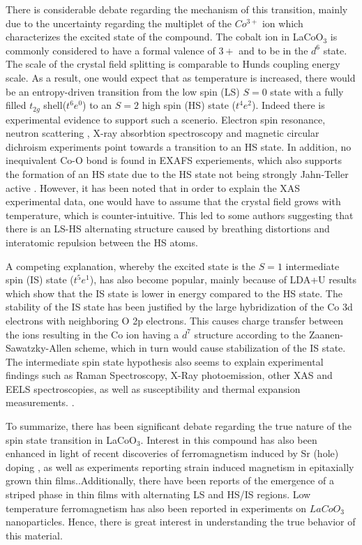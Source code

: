 \documentclass[10pt]{ruthesis}
\begin{document}
{There is considerable debate regarding the mechanism of this transition, mainly due to the uncertainty regarding the multiplet of the $Co^{3+}$ ion which  characterizes the excited state of the compound.  The cobalt ion in LaCoO$_3$ is commonly considered to have a formal valence of $3+$ and to be in the $d^6$ state. The scale of the crystal field splitting is comparable to Hunds coupling energy scale. As a result, one would expect that as temperature is increased, there would be an entropy-driven transition from the low spin (LS) $S=0$ state with a fully filled $t_{2g}$ shell($t^6e^0$) to an $S=2$ high spin (HS) state ($t^4e^2$)\cite{Goodenough}. Indeed there is experimental evidence to support such a scenerio. Electron spin resonance\cite{Zopka}, neutron scattering \cite{Podlesnyak}, X-ray absorbtion spectroscopy and magnetic circular dichroism experiments\cite{Haverfort} point towards a transition to an HS state. In addition, no inequivalent Co-O bond is found in EXAFS experiements, which also supports the formation of an HS state due to the HS state not being strongly Jahn-Teller active \cite{Sundaram}. However, it has been noted that in order to explain the  XAS experimental data, one would have to assume that the crystal field grows with temperature, which is counter-intuitive.\cite{Eder, Haverfort} This led to some authors suggesting that there is an LS-HS alternating structure caused by breathing distortions\cite{Bari} \cite{Goodenough} and interatomic repulsion between the HS atoms.\cite{Asaka, Eder} 
 
A competing explanation, whereby the excited state is the $S=1$ intermediate spin (IS) state ($t^5e^1$), has also become popular\cite{Heikes, Radaelli}, mainly because of LDA+U results which show that the    
IS state is lower in energy compared to the HS state.\cite{Korotin, Pandey, Anisimov} The stability of the IS state has been justified by the large hybridization of the Co 3d electrons with neighboring O 2p electrons. This causes charge transfer between the ions resulting in the Co ion having a $d^7$ structure according to the Zaanen-Sawatzky-Allen scheme,\cite{Zaanen} which in turn would cause stabilization of the IS state. The intermediate spin state hypothesis also seems to explain experimental findings such as Raman Spectroscopy, X-Ray photoemission, other XAS and EELS spectroscopies, as well as susceptibility and thermal expansion measurements. \cite{Saitoh, Abbate, Masuda, Klie, Zobel, Gne, Maris, Vogt}. 

To summarize, there has been significant debate regarding the true nature of the spin state transition in LaCoO$_3$. Interest in this compound has also been enhanced in light of recent discoveries of ferromagnetism induced by Sr (hole) doping \cite{Kriener, Masayuki, Kunes_doped,nemeth}, as well as experiments reporting strain induced magnetism in epitaxially grown thin films.\cite{Fuchs1, Fuchs2, Rondinelli, Freeland, Fuchs3, Herklotz,Hsu}.Additionally, there have been reports of the emergence of a striped phase in thin films with alternating LS and HS/IS regions.\cite{Striped}   Low temperature ferromagnetism has also been reported in experiments on $LaCoO_3$ nanoparticles\cite{Belanger1}. Hence, there is great interest in understanding the true behavior of this material. 

}
\end{document}
